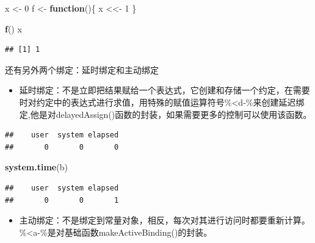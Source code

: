 \documentclass[]{book}
\newenvironment{Shaded}{\begin{snugshade}}{\end{snugshade}}
\newcommand{\KeywordTok}[1]{\textcolor[rgb]{0.13,0.29,0.53}{\textbf{#1}}}
\newcommand{\DecValTok}[1]{\textcolor[rgb]{0.00,0.00,0.81}{#1}}
\newcommand{\StringTok}[1]{\textcolor[rgb]{0.31,0.60,0.02}{#1}}
\newcommand{\ControlFlowTok}[1]{\textcolor[rgb]{0.13,0.29,0.53}{\textbf{#1}}}
\newcommand{\OperatorTok}[1]{\textcolor[rgb]{0.81,0.36,0.00}{\textbf{#1}}}
\newcommand{\NormalTok}[1]{#1}
\providecommand{\tightlist}{%
  \setlength{\itemsep}{0pt}\setlength{\parskip}{0pt}}
\begin{document}
\begin{Shaded}
\begin{Highlighting}[]
\NormalTok{x <-}\StringTok{ }\DecValTok{0}
\NormalTok{f <-}\StringTok{ }\ControlFlowTok{function}\NormalTok{()\{}
\NormalTok{  x <<-}\StringTok{ }\DecValTok{1}
\NormalTok{\}}

\KeywordTok{f}\NormalTok{()}
\NormalTok{x}
\end{Highlighting}
\end{Shaded}

\begin{verbatim}
## [1] 1
\end{verbatim}

还有另外两个绑定：延时绑定和主动绑定

\begin{itemize}
\tightlist
\item
  延时绑定：不是立即把结果赋给一个表达式，它创建和存储一个约定，在需要时对约定中的表达式进行求值，用特殊的赋值运算符号\%\textless{}d-\%来创建延迟绑定,他是对delayedAssign()函数的封装，如果需要更多的控制可以使用该函数。
\end{itemize}

\begin{Shaded}
\end{Shaded}

\begin{verbatim}
##    user  system elapsed 
##       0       0       0
\end{verbatim}

\begin{Shaded}
\begin{Highlighting}[]
\KeywordTok{system.time}\NormalTok{(b)}
\end{Highlighting}
\end{Shaded}

\begin{verbatim}
##    user  system elapsed 
##       0       0       1
\end{verbatim}

\begin{itemize}
\tightlist
\item
  主动绑定：不是绑定到常量对象，相反，每次对其进行访问时都要重新计算。\%\textless{}a-\%是对基础函数makeActiveBinding()的封装。
\end{itemize}
\end{document}
